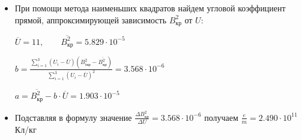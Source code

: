 \begin{itemize}
    \item При помощи метода наименьших квадратов найдем угловой коэффициент прямой, аппроксимирующей 
    зависимость $B^2_\text{кр}$ от $U$:

    $\overline{U} = 11, \qquad \overline{B^2_\text{кр}} = 5.829 \cdot 10^{-5}$

    $\displaystyle b = \frac{\sum_{i = 1}^3 (U_i - \overline{U})(B^2_{i\text{кр}} - \overline{B^2_\text{кр}})}{\sum_{i = 1}^3 (U_i - \overline{U})^2} = 3.568 \cdot 10^{-6}$

    $a = \overline{B^2_\text{кр}} - b \cdot \overline{U} = 1.903 \cdot 10^{-5}$

    \item Подставляя в формулу значение $\displaystyle \frac{\Delta B^2_\text{кр}}{\Delta U} = 3.568 \cdot 10^{-6}$ получаем $\displaystyle \frac{e}{m} = 2.490 \cdot 10^{11} $ Кл/кг

\end{itemize}
